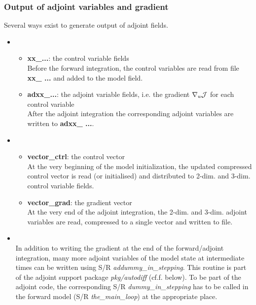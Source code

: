 \subsubsection{Output of adjoint variables and gradient}
%
Several ways exist to generate output of adjoint fields.
%
\begin{itemize}
%
\item 
{}
\\
\begin{itemize}
%
\item {\bf xx\_...}: the control variable fields \\
Before the forward integration, the control
variables are read from file {\bf xx\_ ...} and added to
the model field.
%
\item {\bf adxx\_...}: the adjoint variable fields, i.e. the gradient
$ \nabla _{u}{\cal J} $ for each control variable \\
After the adjoint integration the corresponding adjoint
variables are written to {\bf adxx\_ ...}.
%
\end{itemize}
%
\item 
{}
\\
%
\begin{itemize}
%
\item {\bf vector\_ctrl}: the control vector \\
At the very beginning of the model initialization,
the updated compressed control vector is read (or initialised)
and distributed to 2-dim. and 3-dim. control variable fields.
%
\item {\bf vector\_grad}: the gradient vector \\
At the very end of the adjoint integration,
the 2-dim. and 3-dim. adjoint variables are read,
compressed to a single vector and written to file.
%
\end{itemize}
%
\item 
{}
\\
In addition to writing the gradient at the end of the
forward/adjoint integration, many more adjoint variables
of the model state
at intermediate times can be written using S/R 
{\it addummy\_in\_stepping}.
This routine is part of the adjoint support package 
{\it pkg/autodiff} (cf.f. below).
To be part of the adjoint code, the corresponding S/R
{\it dummy\_in\_stepping} has to be called in the forward
model (S/R {\it the\_main\_loop}) at the appropriate place.


\end{itemize}

